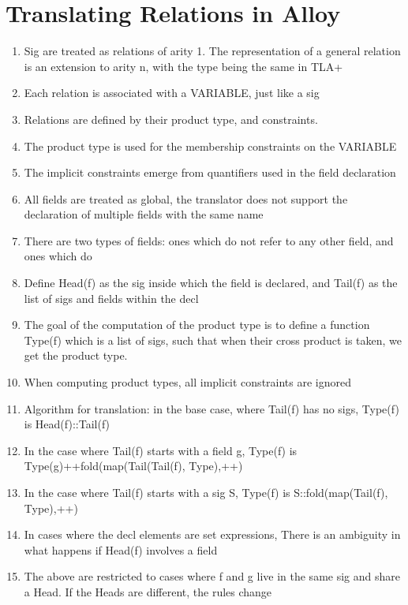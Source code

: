 \section{Translating Relations in Alloy}


\begin{enumerate}
	\item Sig are treated as relations of arity 1. The representation of a general relation is an extension to arity n, with the type being the same in TLA+
	\item Each relation is associated with a VARIABLE, just like a sig
	\item Relations are defined by their product type, and constraints. 
	\item The product type is used for the membership constraints on the VARIABLE
	\item The implicit constraints emerge from quantifiers used in the field declaration
	\item All fields are treated as global, the translator does not support the declaration of multiple fields with the same name
	\item There are two types of fields: ones which do not refer to any other field, and ones which do
	\item Define Head(f) as the sig inside which the field is declared, and Tail(f) as the list of sigs and fields within the decl
	\item The goal of the computation of the product type is to define a function Type(f) which is a list of sigs, such that when their cross product is taken, we get the product type.
	\item When computing product types, all implicit constraints are ignored
	\item Algorithm for translation: in the base case, where Tail(f) has no sigs, Type(f) is Head(f)::Tail(f)
	\item In the case where Tail(f) starts with a field g, Type(f) is Type(g)++fold(map(Tail(Tail(f), Type),++)
	\item In the case where Tail(f) starts with a sig S, Type(f) is S::fold(map(Tail(f), Type),++)
	\item In cases where the decl elements are set expressions, There is an ambiguity in what happens if Head(f) involves a field
	\item The above are restricted to cases where f and g live in the same sig and share a Head. If the Heads are different, the rules change
\end{enumerate}


